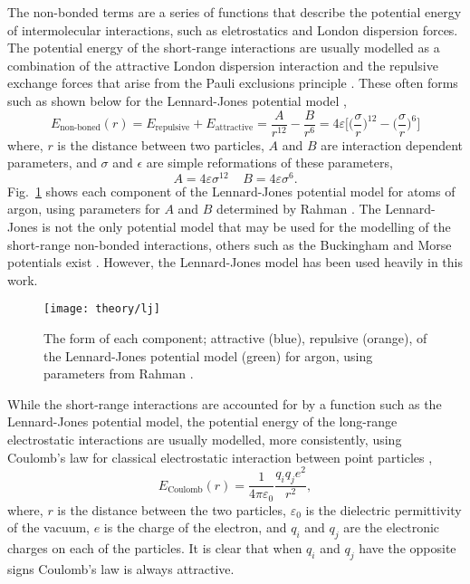 The non-bonded terms are a series of functions that describe the potential energy of intermolecular interactions, such as eletrostatics and London dispersion forces.
The potential energy of the short-range interactions are usually modelled as a combination of the attractive London dispersion interaction and the repulsive exchange forces that arise from the Pauli exclusions principle \cite{Leach1996}.
These often forms such as shown below for the Lennard-Jones potential model \cite{LennardJones1924},
%
\begin{equation}
  E_{\text{non-boned}}(r) = E_{\text{repulsive}} + E_{\text{attractive}} = \frac{A}{r^{12}} - \frac{B}{r^6} = 4\varepsilon\Bigg[\bigg(\frac{\sigma}{r}\bigg)^{12} - \bigg(\frac{\sigma}{r}\bigg)^6\Bigg]
\end{equation}
%
where, $r$ is the distance between two particles, $A$ and $B$ are interaction dependent parameters, and $\sigma$ and $\epsilon$ are simple reformations of these parameters,
%
\begin{equation}
  A = 4\varepsilon\sigma^{12} \;\;\;\; B = 4\varepsilon\sigma^6.
\end{equation}
%
Fig.~\ref{fig:lj} shows each component of the Lennard-Jones potential model for atoms of argon, using parameters for $A$ and $B$ determined by Rahman \cite{Rahman1964}.
The Lennard-Jones is not the only potential model that may be used for the modelling of the short-range non-bonded interactions, others such as the Buckingham and Morse potentials exist \cite{Buckingham1938, Morse1929}.
However, the Lennard-Jones model has been used heavily in this work.
%
\begin{figure}
	\centering
	\texttt{[image: theory/lj]}
	\caption{The form of each component; attractive (blue), repulsive (orange), of the Lennard-Jones potential model (green) for argon, using parameters from Rahman \cite{Rahman1964}.}
	\label{fig:lj}
\end{figure}
%

While the short-range interactions are accounted for by a function such as the Lennard-Jones potential model, the potential energy of the long-range electrostatic interactions are usually modelled, more consistently, using Coulomb's law for classical electrostatic interaction between point particles \cite{Coulomb1788, Coulomb1788a},
%
\begin{equation}
  E_{\text{Coulomb}}(r) = \frac{1}{4\pi\varepsilon_0}{\frac{q_iq_je^2}{r^2}},
\end{equation}
%
where, $r$ is the distance between the two particles, $\varepsilon_0$ is the dielectric permittivity of the vacuum, $e$ is the charge of the electron, and $q_i$ and $q_j$ are the electronic charges on each of the particles.
It is clear that when $q_i$ and $q_j$ have the opposite signs Coulomb's law is always attractive.

